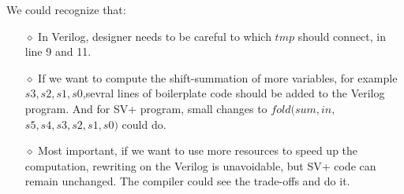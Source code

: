 We could recognize that:
\begin{itemize}
  \item[$\diamond$] In Verilog, designer needs to be careful to which $tmp$ should connect, in line 9 and 11.
  \item[$\diamond$] If we want to compute the shift-summation of more variables, for example $s3,s2,s1,s0$,sevral 
                    lines of boilerplate code should be added to the Verilog program. And for SV+ program, small 
                    changes to $fold(sum,in,$ $s5,s4,s3,s2,s1,s0)$ could do.
  \item[$\diamond$] Most important, if we want to use more resources to speed up the computation, rewriting on 
                    the 
                    Verilog is unavoidable, but SV+ code can remain unchanged. The compiler could see the  
                    trade-offs and do it.  
\end{itemize} 
